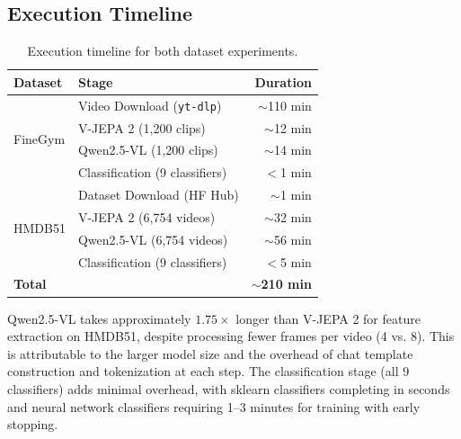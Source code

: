 \subsection{Execution Timeline}

\begin{table}[H]
\centering
\caption{Execution timeline for both dataset experiments.}
\label{tab:execution_timeline}
\begin{tabular}{llr}
\toprule
\textbf{Dataset} & \textbf{Stage} & \textbf{Duration} \\
\midrule
\multirow{4}{*}{FineGym} & Video Download (\texttt{yt-dlp}) & $\sim$110 min \\
 & V-JEPA 2 (1,200 clips) & $\sim$12 min \\
 & Qwen2.5-VL (1,200 clips) & $\sim$14 min \\
 & Classification (9 classifiers) & $<$1 min \\
\midrule
\multirow{4}{*}{HMDB51} & Dataset Download (HF Hub) & $\sim$1 min \\
 & V-JEPA 2 (6,754 videos) & $\sim$32 min \\
 & Qwen2.5-VL (6,754 videos) & $\sim$56 min \\
 & Classification (9 classifiers) & $<$5 min \\
\midrule
\textbf{Total} & & \textbf{$\sim$210 min} \\
\bottomrule
\end{tabular}
\end{table}

Qwen2.5-VL takes approximately $1.75\times$ longer than V-JEPA 2 for feature extraction on HMDB51, despite processing fewer frames per video (4 vs. 8). This is attributable to the larger model size and the overhead of chat template construction and tokenization at each step. The classification stage (all 9 classifiers) adds minimal overhead, with sklearn classifiers completing in seconds and neural network classifiers requiring 1--3 minutes for training with early stopping.
